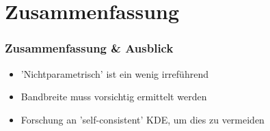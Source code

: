 \section{Zusammenfassung}

\begin{frame}
	\frametitle{Zusammenfassung \& Ausblick}
	\begin{itemize}
		\item 'Nichtparametrisch' ist ein wenig irref\"uhrend
		\item Bandbreite muss vorsichtig ermittelt werden
		\item Forschung an 'self-consistent' KDE, um dies zu vermeiden
	\end{itemize}
\end{frame}
